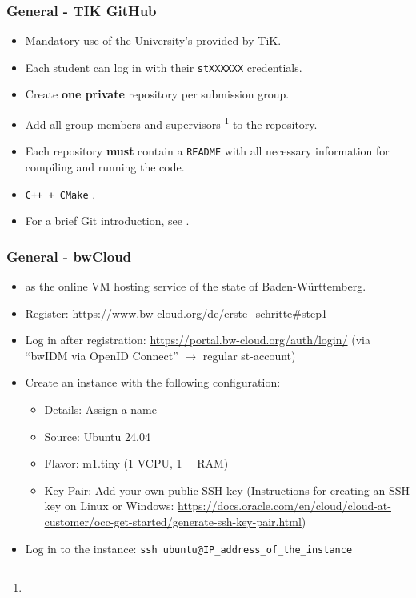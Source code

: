 \begin{frame}
  \frametitle{General - TIK GitHub}
  \begin{itemize}
    \item Mandatory use of the University's provided  by TiK.
    \item Each student can log in with their \texttt{stXXXXXX} credentials.
    \item Create \textbf{one private} repository per submission group.
    \item Add all group members and supervisors \footnote{\supervisorAc} to the repository.
    \item Each repository \textbf{must} contain a \texttt{README} with all necessary information for compiling and running the code.
    \item \texttt{C++ + CMake} .
    \item For a brief Git introduction, see .
  \end{itemize}
\end{frame}

\begin{frame}
  \frametitle{General - bwCloud}
  \begin{itemize}
    \item {} as the online VM hosting service of the state of Baden-Württemberg.
    \item Register: \url{https://www.bw-cloud.org/de/erste_schritte\#step1}
    \item Log in after registration: \url{https://portal.bw-cloud.org/auth/login/} (via \enquote{bwIDM via OpenID Connect} $\rightarrow$ regular st-account)
    \item Create an instance with the following configuration:
    \begin{itemize}
        \item Details: Assign a name
        \item Source: Ubuntu 24.04
        \item Flavor: m1.tiny (1 VCPU, \SI{1}{\giga\byte} RAM)
        \item Key Pair: Add your own public SSH key (Instructions for creating an SSH key on Linux or Windows: \url{https://docs.oracle.com/en/cloud/cloud-at-customer/occ-get-started/generate-ssh-key-pair.html})
    \end{itemize}
    \item Log in to the instance: \texttt{ssh ubuntu@IP\_address\_of\_the\_instance}
  \end{itemize}
\end{frame}

